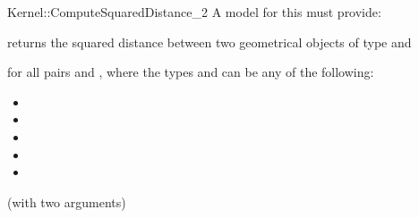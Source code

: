 \begin{ccRefFunctionObjectConcept}{Kernel::ComputeSquaredDistance_2}
A model for this must provide:


{returns the squared distance between two geometrical objects of type
 and  }

for all pairs  and , where
the types  and  can be any of the
following:
\begin{itemize}
\item {}
\item {}
\item {}
\item {}
\item {}
\end{itemize}

\ccRefines
{} (with two arguments)

\ccSeeAlso
{} \\

\end{ccRefFunctionObjectConcept}

